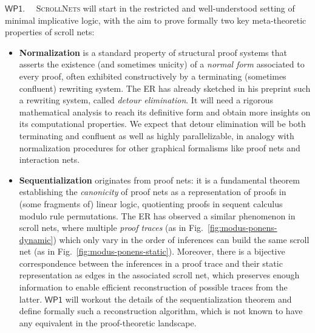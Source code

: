 \documentclass[12pt,draftproposal]{msca-pf}
\newcommand{\proj}{\small\textsc{ScrollNets}}
\newcommand{\WP}[1]{$\mathsf{WP#1}$}
\begin{document}
    \WP{1}.~~ {\proj} will start in the restricted and well-understood setting of minimal
    implicative logic, with the aim to prove formally two key meta-theoretic properties of scroll
    nets:
    \begin{itemize}
        \item \textbf{Normalization} is a standard property of structural proof
        systems that asserts the existence (and sometimes unicity) of a \emph{normal form} associated to
        every proof, often exhibited constructively by a terminating (sometimes confluent) rewriting
        system. The ER has already sketched in his preprint such a rewriting system, called \emph{detour
        elimination}. It will need a rigorous mathematical analysis to reach its definitive form and
        obtain more insights on its computational properties. We expect that detour elimination will be
        both terminating and confluent as well as highly parallelizable, in analogy with normalization
        procedures for other graphical formalisms like proof nets and interaction nets.

        \item \textbf{Sequentialization} originates from proof nets: it is a fundamental theorem establishing the
        \emph{canonicity} of proof nets as a representation of proofs in (some fragments of) linear
        logic, quotienting proofs in sequent calculus modulo rule permutations. The ER has observed a
        similar phenomenon in scroll nets, where multiple \emph{proof traces} (as in
        Fig.~\ref{fig:modus-ponens-dynamic}) which only vary in the order of inferences can build the
        same scroll net (as in Fig.~\ref{fig:modus-ponens-static}). Moreover, there is a bijective
        correspondence between the inferences in a proof trace and their static representation as edges
        in the associated scroll net, which preserves enough information to enable efficient
        reconstruction of possible traces from the latter. \WP{1} will workout the details of the
        sequentialization theorem and define formally such a reconstruction algorithm, which is not
        known to have any equivalent in the proof-theoretic landscape.
    \end{itemize}
    
\end{document}
